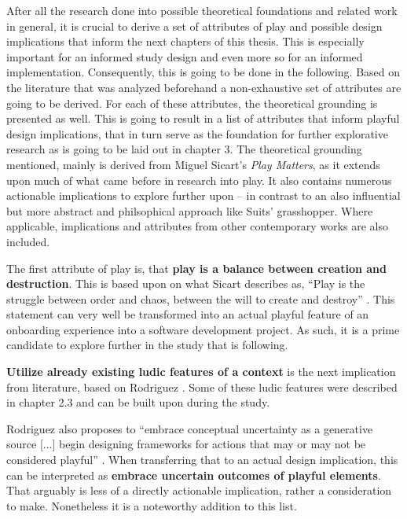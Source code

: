 After all the research done into possible theoretical foundations and related work in general, it is crucial to derive a set of attributes of play and possible design implications that inform the next chapters of this thesis. This is especially important for an informed study design and even more so for an informed implementation. Consequently, this is going to be done in the following. Based on the literature that was analyzed beforehand a non-exhaustive set of attributes are going to be derived. For each of these attributes, the theoretical grounding is presented as well. This is going to result in a list of attributes that inform playful design implications, that in turn serve as the foundation for further explorative research as is going to be laid out in chapter 3. The theoretical grounding mentioned, mainly is derived from Miguel Sicart's \textit{Play Matters}, as it extends upon much of what came before in research into play. It also contains numerous actionable implications to explore further upon -- in contrast to an also influential but more abstract and philsophical approach like Suits' grasshopper. Where applicable, implications and attributes from other contemporary works are also included.

The first attribute of play is, that \textbf{play is a balance between creation and destruction}. This is based upon on what Sicart describes as, \enquote{Play is the struggle between order and chaos, between the will to create and destroy} \cite[p. 5]{sicart2014play}. This statement can very well be transformed into an actual playful feature of an onboarding experience into a software development project. As such, it is a prime candidate to explore further in the study that is following.

\textbf{Utilize already existing ludic features of a context} is the next implication from literature, based on Rodriguez \cite{rodriguez2006playful}. Some of these ludic features were described in chapter 2.3 and can be built upon during the study.

Rodriguez also proposes to \enquote{embrace conceptual uncertainty as a generative source [...] begin designing frameworks for actions that may or may not be considered playful} \cite{rodriguez2006playful}. When transferring that to an actual design implication, this can be interpreted as \textbf{embrace uncertain outcomes of playful elements}. That arguably is less of a directly actionable implication, rather a consideration to make. Nonetheless it is a noteworthy addition to this list.

